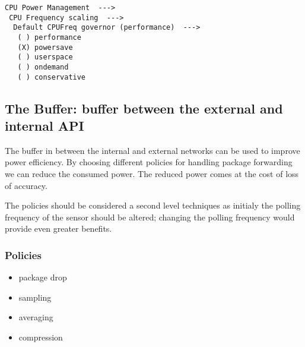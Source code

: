 \begin{verbatim}
CPU Power Management  --->
 CPU Frequency scaling  --->
  Default CPUFreq governor (performance)  --->
   ( ) performance
   (X) powersave
   ( ) userspace
   ( ) ondemand
   ( ) conservative
\end{verbatim}


\subsection{The Buffer: buffer between the external and internal API}

The buffer in between the internal and external networks can be used to improve power efficiency. By choosing different policies for handling package forwarding we can reduce the consumed power. The reduced power comes at the cost of loss of accuracy.

The policies should be considered a second level techniques as initialy the polling frequency of the sensor should be altered; changing the polling frequency would provide even greater benefits. 

\subsubsection{Policies}

\begin{itemize}
 \item package drop
 \item sampling
 \item averaging
 \item compression
\end{itemize}

